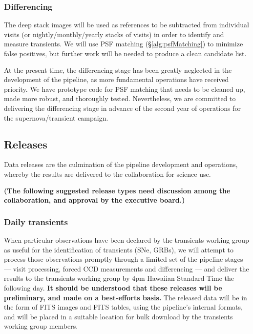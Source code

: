 \documentclass[12pt]{article}
\newcommand\tbd[1]{\textbf{\color{red}(#1)}}
\begin{document}
\subsubsection{Differencing}

The deep stack images will be used as references to be subtracted from individual visits (or
nightly/monthly/yearly stacks of visits) in order to identify and measure transients.  We will use PSF matching
(\S\ref{alg:psfMatching}) to minimize false positives, but further work will be needed to produce a clean
candidate list.

At the present time, the differencing stage has been greatly neglected in the development of the pipeline, as
more fundamental operations have received priority.  We have prototype code for PSF matching that needs to be
cleaned up, made more robust, and thoroughly tested.  Nevertheless, we are committed to delivering the
differencing stage in advance of the second year of operations for the supernova/transient campaign.


\subsection{Releases}

Data releases are the culmination of the pipeline development and operations, whereby the results are delivered
to the collaboration for science use.

\tbd{The following suggested release types need discussion among the collaboration, and approval by the
  executive board.}

\subsubsection{Daily transients}

When particular observations have been declared by the transients working group as useful for the
identification of transients (SNe, GRBs), we will attempt to process those observations promptly through a
limited set of the pipeline stages --- visit processing, forced CCD measurements and differencing --- and
deliver the results to the transients working group by 4pm Hawaiian Standard Time the following day.  {\bf It
  should be understood that these releases will be preliminary, and made on a best-efforts basis.}  The
released data will be in the form of FITS images and FITS tables, using the pipeline's internal formats, and
will be placed in a suitable location for bulk download by the transients working group members.
\end{document}
